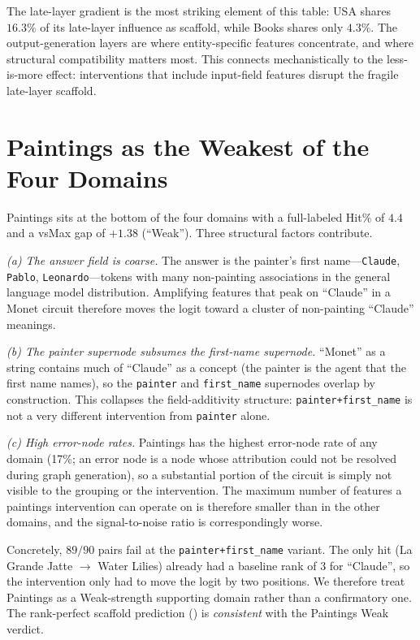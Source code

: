 The late-layer gradient is the most striking element of this table: USA shares $16.3\%$ of its late-layer influence as scaffold, while Books shares only $4.3\%$. The output-generation layers are where entity-specific features concentrate, and where structural compatibility matters most. This connects mechanistically to the less-is-more effect: interventions that include input-field features disrupt the fragile late-layer scaffold.



\section{Paintings as the Weakest of the Four Domains}
\label{appx:negative}

Paintings sits at the bottom of the four domains with a full-labeled Hit\% of $4.4$ and a vsMax gap of $+1.38$ (``Weak''). Three structural factors contribute.

\emph{(a) The answer field is coarse.} The answer is the painter's first name---\texttt{Claude}, \texttt{Pablo}, \texttt{Leonardo}---tokens with many non-painting associations in the general language model distribution. Amplifying features that peak on ``Claude'' in a Monet circuit therefore moves the logit toward a cluster of non-painting ``Claude'' meanings.

\emph{(b) The painter supernode subsumes the first-name supernode.} ``Monet'' as a string contains much of ``Claude'' as a concept (the painter is the agent that the first name names), so the \texttt{painter} and \texttt{first\_name} supernodes overlap by construction. This collapses the field-additivity structure: \texttt{painter+first\_name} is not a very different intervention from \texttt{painter} alone.

\emph{(c) High error-node rates.} Paintings has the highest error-node rate of any domain (17\%; an error node is a node whose attribution could not be resolved during graph generation), so a substantial portion of the circuit is simply not visible to the grouping or the intervention. The maximum number of features a paintings intervention can operate on is therefore smaller than in the other domains, and the signal-to-noise ratio is correspondingly worse.

Concretely, $89/90$ pairs fail at the \texttt{painter+first\_name} variant. The only hit (La Grande Jatte $\to$ Water Lilies) already had a baseline rank of $3$ for ``Claude'', so the intervention only had to move the logit by two positions. We therefore treat Paintings as a Weak-strength supporting domain rather than a confirmatory one. The rank-perfect scaffold prediction () is \emph{consistent} with the Paintings Weak verdict.

